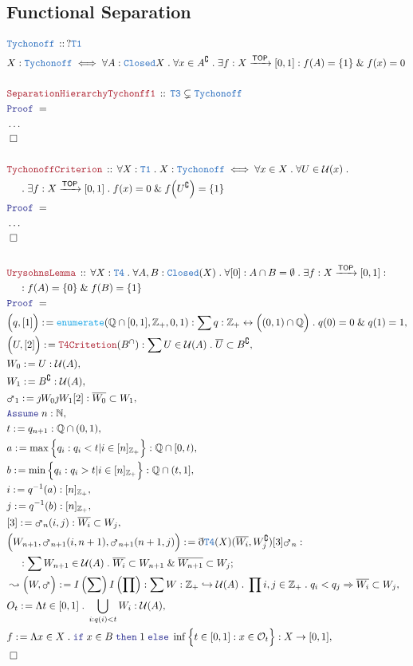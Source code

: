 \documentclass[12pt]{scrartcl}
\newcommand{\TYPE}[1]{\textcolor{NavyBlue}{\mathtt{#1}}}
\newcommand{\FUNC}[1]{\textcolor{Cerulean}{\mathtt{#1}}}
\newcommand{\LOGIC}[1]{\textcolor{Blue}{\mathtt{#1}}}
\newcommand{\THM}[1]{\textcolor{Maroon}{\mathtt{#1}}}
\renewcommand{\.}{\; . \;}
\newcommand{\de}{: \kern 0.1pc =}
\newcommand{\If}{\LOGIC{if} \;}
\newcommand{\Then}{ \; \LOGIC{then} \;}
\newcommand{\Else}{\; \LOGIC{else} \;}
\newcommand{\Act}[1]{\left( #1 \right)}
\newcommand{\Theorem}[2]{& \THM{#1} \, :: \, #2 \\ & \Proof = \\ }
\newcommand{\DeclareType}[2]{& \TYPE{#1} \, :: \, #2 \\}
\newcommand{\DefineType}[3]{& #1 : \TYPE{#2} \iff #3 \\}
\newcommand{\NewLine}{\\ & \kern 1pc}
\newcommand{\Page}[1]{ \begin{align*} #1 \end{align*}   }
\newcommand{ \bd }{ \ByDef }
\newcommand{\NoProof}{ & \ldots \\ \EndProof}
\renewcommand{\And}{\; \& \;}
\newcommand{\Imply}{\Rightarrow}
\newcommand{\Int}{\mathbb{Z} }
\newcommand{\Rats}{\mathbb{Q} }
\newcommand{\Nat}{\mathbb{N} }
\newcommand{\ToInj}{\hookrightarrow}
\newcommand{\ToBij}{\leftrightarrow}
\newcommand{\Arrow}{\xrightarrow}
\renewcommand{\c}{\complement}
\newcommand{\Say}[3]{& #1 \de #2 : #3, \\}
\newcommand{\Conclude}[3]{& #1 \de #2 : #3; \\}
\newcommand{\Derive}[3]{& \leadsto #1 \de #2 : #3, \\}
\newcommand{\Assume}[2]{& \LOGIC{Assume} \; #1 : #2, \\}
\newcommand{\QED}{\; \square}
\newcommand{\EndProof}{& \QED \\}
\newcommand{\ByDef}{\eth}
\newcommand{\ByConstr}{\jmath}
\newcommand{\Proof}{\LOGIC{Proof} \; }
\newcommand{\TOP}{\mathsf{TOP}}
\newcommand{\U}{\mathcal{U}}
\renewcommand{\O}{\mathcal{O}}
\begin{document}
\subsection{Functional Separation}
\Page{
	\DeclareType{Tychonoff}{?\TYPE{T1}}   
	\DefineType{X}{Tychonoff}{ 
		\forall A : \TYPE{Closed}{X} \.   
		\forall x \in A^\c \.
		\exists f : X \Arrow{\TOP} [0,1] :
		f(A) = \{1\} \And f(x) = 0
	}
	\\
	\Theorem{SeparationHierarchyTychonff1}
	{
		\TYPE{T3} \subsetneq \TYPE{Tychonoff}
	}
	\NoProof
	\\
	\Theorem{TychonoffCriterion}
	{
		\forall X : \TYPE{T1} \.
		X : \TYPE{Tychonoff} 
		\iff
		\forall x \in X \.
		\forall U \in \U(x) \. \NewLine \.  
		\exists f : X \Arrow{\TOP} [0,1] \.
		f(x) = 0 \And f\Big(U^\c\Big) = \{1\}
	}
	\NoProof
	\\
	\Theorem{UrysohnsLemma}
	{
		\forall X : \TYPE{T4} \.
		\forall A,B : \TYPE{Closed}(X) \. 
		\forall [0] : A \cap B = \emptyset \.
		\exists f : X \Arrow{\TOP} [0,1] : \NewLine : 
		f(A) = \{0\} \And f(B) = \{1\}
	}
	\Say{\Big(q,[1]\Big)}{\FUNC{enumerate}(\Rats \cap [0,1], \Int_+, 0,1)}
	{
		\sum  q : \Int_+ \ToBij \Big( (0, 1) \cap \Rats \Big) \. q(0) = 0 \And q(1) = 1 
	}
	\Say{\Big( U,  [2] \Big)}{ \THM{T4Critetion}(B^\cap) }
	{
		\sum U \in \U(A) \. 
		\overline{U} \subset B^\c
	}
	\Say{W_0}{U}{\U(A)}
	\Say{W_1}{B^\c}{\U(A)}
	\Say{\mars_1}{\ByConstr W_0 \ByConstr W_1[2]}{ \overline{W_0} \subset W_1}
	\Assume{n}{\Nat}
	\Say{t}{q_{n+1}}{\Rats \cap (0,1)}
	\Say{a}{ \max \Big\{ q_i :  q_i < t | i \in [n]_{\Int_+}  \Big\} }{\Rats \cap [0,t)} 
	\Say{b}{ \min \Big\{ q_i :  q_i > t | i \in [n]_{\Int_+}  \Big\} }{\Rats \cap (t,1]}
	\Say{i}{q^{-1}(a)}{[n]_{\Int_+}} 
	\Say{j}{q^{-1}(b)}{[n]_{\Int_+}}
	\Say{[3]}{\mars_n(i,j)}{\overline{W_i} \subset W_j}
	\Conclude{ \Big(W_{n+1}, \mars_{n+1}(i,n+1),\mars_{n+1}(n+1,j)  \Big) }
	{ \bd \TYPE{T4}(X)(\overline{W_i}, W_j^\c) [3] \mars_n   }
	{    
		\NewLine : 
		\sum W_{n+1} \in \U(A) \.   \overline{ W_i} \subset W_{n+1} \And \overline{W_{n+1}} \subset W_j
	}  
	\Derive{\Big( W, \mars \Big) }{I\Act{\sum}I\Act{\prod}}
	{
		\sum  W : \Int_+ \ToInj \U(A) \. \prod  i,j \in \Int_+ \. q_i < q_j \Imply \overline{W_i} \subset W_j
	}
	\Say{O_t}{\Lambda t \in [0,1] \. \bigcup_{i : q(i) < t} W_i}{\U(A)}
	\Say{f}{\Lambda x \in X \. \If x \in B \Then 1 \Else \inf 
		\Big\{  t \in [0,1] :  x \in \O_t   \Big\}}{X \to [0,1]}            
	\EndProof
}
\end{document}
